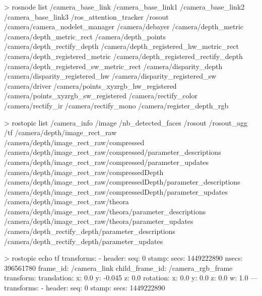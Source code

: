 \documentclass[compress]{beamer}
\begin{document}
\begin{frame}[fragile]{}
\begin{shcode}
> rosnode list 
/camera_base_link
/camera_base_link1
/camera_base_link2
/camera_base_link3
/ros_attention_tracker
/rosout
/camera/camera_nodelet_manager
/camera/debayer
/camera/depth_metric
/camera/depth_metric_rect
/camera/depth_points
/camera/depth_rectify_depth
/camera/depth_registered_hw_metric_rect
/camera/depth_registered_metric
/camera/depth_registered_rectify_depth
/camera/depth_registered_sw_metric_rect
/camera/disparity_depth
/camera/disparity_registered_hw
/camera/disparity_registered_sw
/camera/driver
/camera/points_xyzrgb_hw_registered
/camera/points_xyzrgb_sw_registered
/camera/rectify_color
/camera/rectify_ir
/camera/rectify_mono
/camera/register_depth_rgb
\end{shcode}

\end{frame}

\begin{frame}[fragile]{}
\begin{shcode}
> rostopic list
/camera_info
/image
/nb_detected_faces
/rosout
/rosout_agg
/tf
/camera/depth/image_rect_raw
/camera/depth/image_rect_raw/compressed
/camera/depth/image_rect_raw/compressed/parameter_descriptions
/camera/depth/image_rect_raw/compressed/parameter_updates
/camera/depth/image_rect_raw/compressedDepth
/camera/depth/image_rect_raw/compressedDepth/parameter_descriptions
/camera/depth/image_rect_raw/compressedDepth/parameter_updates
/camera/depth/image_rect_raw/theora
/camera/depth/image_rect_raw/theora/parameter_descriptions
/camera/depth/image_rect_raw/theora/parameter_updates
/camera/depth_rectify_depth/parameter_descriptions
/camera/depth_rectify_depth/parameter_updates
\end{shcode}

\end{frame}

\begin{frame}[fragile]{}
\begin{shcode}
> rostopic echo tf
transforms: 
  - 
    header: 
      seq: 0
      stamp: 
        secs: 1449222890
        nsecs: 396561780
      frame_id: /camera_link
    child_frame_id: /camera_rgb_frame
    transform: 
      translation: 
        x: 0.0
        y: -0.045
        z: 0.0
      rotation: 
        x: 0.0
        y: 0.0
        z: 0.0
        w: 1.0
---
transforms: 
  - 
    header: 
      seq: 0
      stamp: 
        secs: 1449222890

\end{shcode}

\end{frame}
\end{document}
